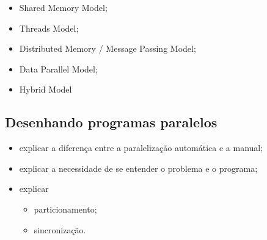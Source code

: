         \begin{itemize}
            \item Shared Memory Model;
            \item Threads Model;
            \item Distributed Memory / Message Passing Model;
            \item Data Parallel Model;
            \item Hybrid Model
        \end{itemize}
    
    \subsection{Desenhando programas paralelos}
    
	    \label{subsec:parallel-design}
    
        \begin{itemize}
            \item explicar a diferença entre a paralelização automática e a 
            manual;
            \item explicar a necessidade de se entender o problema e o programa;
            \item explicar
            \begin{itemize}
            	\item particionamento;
            	\item sincronização.
            \end{itemize}

        \end{itemize}